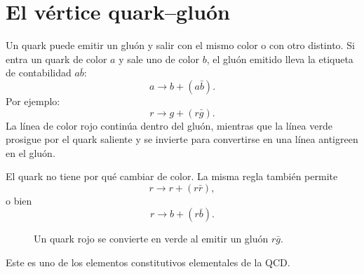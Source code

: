 \section{El vértice quark--gluón}

Un quark puede emitir un gluón y salir con el mismo color o con otro distinto. Si entra un quark de color \(a\) y sale uno de color \(b\), el gluón emitido lleva la etiqueta de contabilidad \(a\bar b\):
\begin{equation}
a\longrightarrow b+(a\bar b).
\end{equation}
Por ejemplo:
\begin{equation}
r\longrightarrow g+(r\bar g).
\end{equation}
La línea de color rojo continúa dentro del gluón, mientras que la línea verde prosigue por el quark saliente y se invierte para convertirse en una línea antigreen en el gluón.

El quark no tiene por qué cambiar de color. La misma regla también permite
\begin{equation}
r\longrightarrow r+(r\bar r),
\end{equation}
o bien
\begin{equation}
r\longrightarrow b+(r\bar b).
\end{equation}

\begin{figure}[h]
\centering
{}
\caption{Un quark rojo se convierte en verde al emitir un gluón \(r\bar g\).}
\end{figure}

Este es uno de los elementos constitutivos elementales de la QCD.

\begin{classroomqa}
\end{classroomqa}


